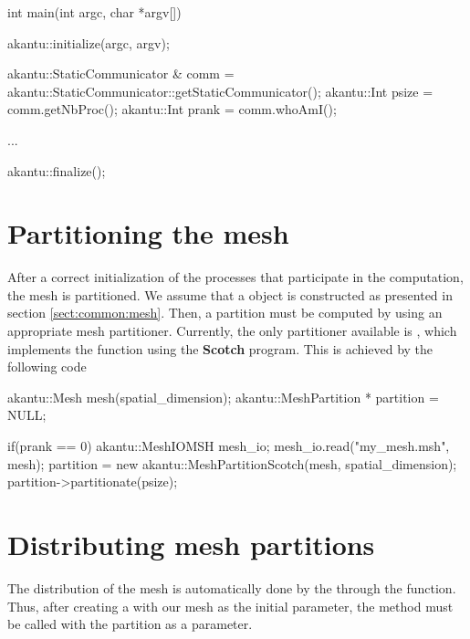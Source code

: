 \begin{cpp}
int main(int argc, char *argv[])
{
  akantu::initialize(argc, argv);

  akantu::StaticCommunicator & comm =
  akantu::StaticCommunicator::getStaticCommunicator();
  akantu::Int psize = comm.getNbProc();
  akantu::Int prank = comm.whoAmI();

  ...

  akantu::finalize();
}
\end{cpp}

\section{Partitioning the mesh}

After a correct initialization of the processes that participate in the
computation, the mesh is partitioned. We assume that a  object
is constructed as presented in section \ref{sect:common:mesh}.  Then, a partition
must be computed by using an appropriate mesh partitioner. Currently, the
only partitioner available is , which implements the
function  using the \textbf{Scotch}\cite{scotch} program.
This is achieved by the following code

\begin{cpp}
  akantu::Mesh mesh(spatial_dimension);
  akantu::MeshPartition * partition = NULL;

  if(prank == 0) {
    akantu::MeshIOMSH mesh_io;
    mesh_io.read("my_mesh.msh", mesh);
    partition = new akantu::MeshPartitionScotch(mesh, spatial_dimension);
    partition->partitionate(psize);
  }
\end{cpp}


\section{Distributing mesh partitions}

The distribution of the mesh is automatically done by the
 through the  function.  Thus,
after creating a  with our mesh as the initial
parameter, the  method must be called with the partition
as a parameter.

